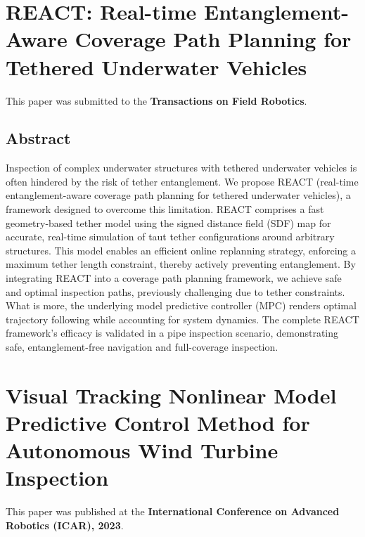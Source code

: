 \documentclass[
10pt, %
b5paper, %
twoside, %
openright  %
]{book}  %
\begin{document}
\newpage 

 



\chapter{REACT: Real-time Entanglement-Aware Coverage
Path Planning for Tethered Underwater Vehicles}
\vspace{1cm}

This paper was submitted to the \textbf{Transactions on Field Robotics}.

 \section{Abstract}
 Inspection of complex underwater structures with tethered underwater vehicles is often hindered by the risk of tether entanglement. We propose REACT (real-time entanglement-aware coverage path planning for tethered underwater vehicles), a framework designed to overcome this
limitation. REACT comprises a fast geometry-based tether model using the signed distance field (SDF) map for accurate, real-time simulation of taut tether configurations around arbitrary structures. This model enables an efficient online replanning strategy, enforcing a maximum tether length constraint, thereby actively preventing entanglement. By integrating REACT into a coverage path planning framework, we achieve safe and optimal inspection paths, previously challenging due to tether constraints. What is more, the underlying model predictive controller (MPC) renders optimal trajectory following while accounting for system dynamics. The complete REACT framework’s efficacy is validated in a pipe inspection scenario, demonstrating safe, entanglement-free navigation and full-coverage inspection.

 \newpage
 



\chapter{Visual Tracking Nonlinear Model Predictive Control Method for
Autonomous Wind Turbine Inspection}
\vspace{1cm}
This paper was published at the \textbf{International Conference on Advanced Robotics (ICAR), 2023}.
\end{document}
